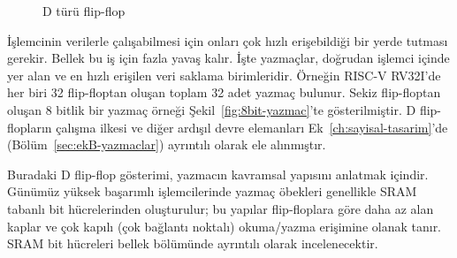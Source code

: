 \begin{figure}[H]
\centering
{}
\caption{D türü flip-flop}
\label{fig:d-flip-flop}
\end{figure}

İşlemcinin verilerle çalışabilmesi için onları çok hızlı erişebildiği bir yerde tutması gerekir. Bellek bu iş için fazla yavaş kalır. İşte yazmaçlar, doğrudan işlemci içinde yer alan ve en hızlı erişilen veri saklama birimleridir. Örneğin RISC-V RV32I'de her biri 32 flip-floptan oluşan toplam 32 adet yazmaç bulunur. Sekiz flip-floptan oluşan 8 bitlik bir yazmaç örneği Şekil~\ref{fig:8bit-yazmac}'te gösterilmiştir. D flip-flopların çalışma ilkesi ve diğer ardışıl devre elemanları Ek~\ref{ch:sayisal-tasarim}'de (Bölüm~\ref{sec:ekB-yazmaclar}) ayrıntılı olarak ele alınmıştır.

Buradaki D flip-flop gösterimi, yazmacın kavramsal yapısını anlatmak içindir. Günümüz yüksek başarımlı işlemcilerinde yazmaç öbekleri genellikle SRAM tabanlı bit hücrelerinden oluşturulur; bu yapılar flip-floplara göre daha az alan kaplar ve çok kapılı (çok bağlantı noktalı) okuma/yazma erişimine olanak tanır. SRAM bit hücreleri bellek bölümünde ayrıntılı olarak incelenecektir.

